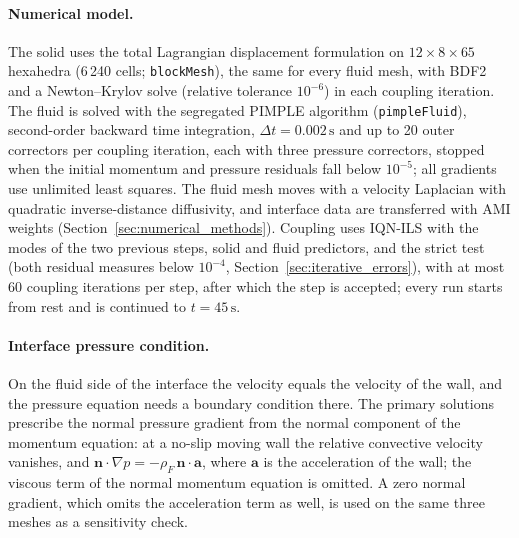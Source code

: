 \paragraph{Numerical model.}
The solid uses the total Lagrangian displacement formulation on $12 \times 8 \times 65$ hexahedra (6\,240 cells; \texttt{blockMesh}), the same for every fluid mesh, with BDF2 and a Newton--Krylov solve (relative tolerance $10^{-6}$) in each coupling iteration.
The fluid is solved with the segregated PIMPLE algorithm (\texttt{pimpleFluid}), second-order backward time integration, $\Delta t = 0.002\,\mathrm{s}$ and up to 20 outer correctors per coupling iteration, each with three pressure correctors, stopped when the initial momentum and pressure residuals fall below $10^{-5}$; all gradients use unlimited least squares.
The fluid mesh moves with a velocity Laplacian with quadratic inverse-distance diffusivity, and interface data are transferred with AMI weights (Section~\ref{sec:numerical_methods}).
Coupling uses IQN-ILS with the modes of the two previous steps, solid and fluid predictors, and the strict test (both residual measures below $10^{-4}$, Section~\ref{sec:iterative_errors}), with at most 60 coupling iterations per step, after which the step is accepted; every run starts from rest and is continued to $t = 45\,\mathrm{s}$.

\paragraph{Interface pressure condition.}
On the fluid side of the interface the velocity equals the velocity of the wall, and the pressure equation needs a boundary condition there.
The primary solutions prescribe the normal pressure gradient from the normal component of the momentum equation: at a no-slip moving wall the relative convective velocity vanishes, and $\mathbf{n}\cdot\nabla p = -\rho_F\,\mathbf{n}\cdot\mathbf{a}$, where $\mathbf{a}$ is the acceleration of the wall; the viscous term of the normal momentum equation is omitted.
A zero normal gradient, which omits the acceleration term as well, is used on the same three meshes as a sensitivity check.

